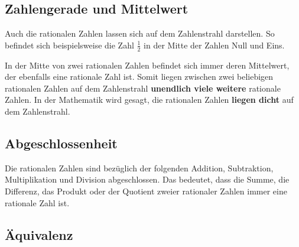 \subsection{Zahlengerade und Mittelwert}

Auch die rationalen Zahlen lassen sich auf dem Zahlenstrahl darstellen. So befindet sich beispielsweise die Zahl $\frac{1}{2}$ in der Mitte der Zahlen Null und Eins.

\begin{center}
\end{center}
In der Mitte von zwei rationalen Zahlen befindet sich immer deren Mittelwert, der ebenfalls eine rationale Zahl ist. Somit liegen zwischen zwei beliebigen rationalen Zahlen auf dem Zahlenstrahl \textbf{unendlich viele weitere} rationale Zahlen. In der Mathematik wird gesagt, die rationalen Zahlen \textbf{liegen dicht} auf dem Zahlenstrahl.

\subsection{Abgeschlossenheit}

Die rationalen Zahlen sind bezüglich der folgenden Addition, Subtraktion, Multiplikation und Division abgeschlossen. Das bedeutet, dass die Summe, die Differenz, das Produkt oder der Quotient zweier rationaler Zahlen immer eine rationale Zahl ist.

\subsection{Äquivalenz}

